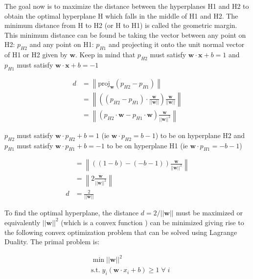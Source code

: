 The goal now is to maximize the distance between the hyperplanes H1 and H2 to obtain the optimal hyperplane H which falls in the middle of H1 and H2. The minimum distance from H to H2 (or H to H1) is called the geometric margin. This minimum distance can be found be taking the vector between any point on H2: $p_{H2}$ and any point on H1: $p_{H1}$ and projecting it onto the unit normal vector of H1 or H2 given by $\mathbf{w}$. Keep in mind that $p_{H2}$ must satisfy $\mathbf{w} \cdot \mathbf{x} + b = 1$ and $p_{H1}$ must satisfy $\mathbf{w} \cdot \mathbf{x} + b = -1$

\begin{equation*}
    \begin{split}
    d &= \left\lVert\text{proj}_\mathbf{w}{(p_{H2} - p_{H1})} \right\rVert \\
     &= \left\lVert \left ((p_{H2} - p_{H1}) \cdot \mathbf{\frac{w}{||w||}}\right ) \frac{\mathbf{w}}{||\mathbf{w}||} \right\rVert \\ 
     &= \left\lVert \left (p_{H2} \cdot \mathbf{w} - p_{H1} \cdot \mathbf{w} \right ) \frac{\mathbf{w}}{||\mathbf{w}||^2} \right\rVert
    \end{split}
\end{equation*}

 $p_{H2}$ must satisfy $\mathbf{w} \cdot p_{H2} + b = 1$ (ie $\mathbf{w} \cdot p_{H2} = b - 1$) to be on hyperplane H2 and $p_{H1}$ must satisfy $\mathbf{w} \cdot p_{H1} + b = -1$ to be on hyperplane H1 (ie $\mathbf{w} \cdot p_{H1} = -b - 1$)

\begin{equation}
    \begin{split}
     &= \left\lVert \left ((1 - b) - (-b - 1) \right ) \frac{\mathbf{w}}{||\mathbf{w}||^2} \right\rVert \\
     &= \left\lVert 2 \frac{\mathbf{w}}{||\mathbf{w}||^2} \right\rVert \\ 
     d &= \frac{2}{||\mathbf{w}||}
    \end{split}
\end{equation}

To find the optimal hyperplane, the distance $d = 2 / ||\mathbf{w}||$ must be maximized or equivalently $||\mathbf{w}||^2$ (which is a convex function \cite{cervantesComprehensiveSurveySupport2020}) can be minimized giving rise to the following convex optimization problem that can be solved using Lagrange Duality. The primal problem is:

\begin{equation}
    \begin{split}
    & \min ||\mathbf{w}||^2 \\
    & \text{s.t.} \; y_i (\mathbf{w} \cdot x_i + b) \geq 1 \; \forall \; i
    \end{split}
    \label{eq:svm-optimization}
\end{equation}

